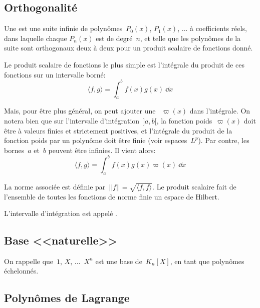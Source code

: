 \medskip
\subsection{Orthogonalité}

Une  est 
une suite infinie de polynômes~$P_0(x)$, $P_1(x)$, ... à coefficients réels, dans laquelle chaque 
$P_n(x)$ est de degré~$n$, et telle que les polynômes de la suite sont orthogonaux deux à deux 
pour un produit scalaire de fonctions donné.

\medskip
Le produit scalaire de fonctions le plus simple est l'intégrale du produit de ces fonctions
sur un intervalle borné:
\begin{equation}
  \langle f,g \rangle=\int_a^b f(x)g(x)~\dd x
\end{equation}

\medskip
Mais, pour être plus général, on peut ajouter une ~$\varpi(x)$ dans 
l'intégrale.
On notera bien que sur l'intervalle d'intégration~$]a,b[$, la fonction poids~$\varpi(x)$ doit être à 
valeurs finies et strictement positives, et l'intégrale du produit de la fonction poids par un polynôme 
doit être finie (voir espaces~$L^p$).
Par contre, les bornes~$a$ et~$b$ peuvent être infinies.
Il vient alors:
\begin{equation}
  \langle f,g \rangle=\int_a^b f(x)g(x)\varpi(x)~\dd x
\end{equation}

La norme associée est définie par~$||f||=\sqrt{\langle f,f \rangle}$.
Le produit scalaire fait de l'ensemble de toutes les fonctions de norme finie un 
espace de Hilbert.

L'intervalle d'intégration est appelé .




\medskip
\subsection{Base <<naturelle>>}

On rappelle que~$1$, $X$, ...~$X^n$ est une base de~$K_n[X]$, en tant que
polynômes échelonnés.



\medskip
\subsection{Polynômes de Lagrange}

